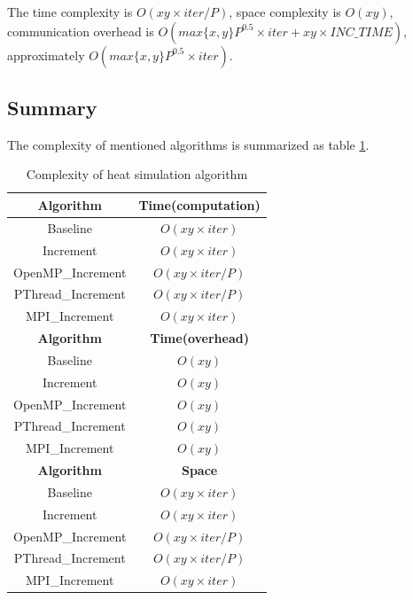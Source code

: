 \documentclass{acm_proc_article-sp}
\begin{document}
The time complexity is $O(xy\times iter/P)$, space complexity is $O(xy)$, communication overhead is $O(max\{x,y\}P^{0.5}\times iter+xy\times INC\_TIME)$, approximately $O(max\{x,y\}P^{0.5}\times iter)$.

\subsection{Summary}

The complexity of mentioned algorithms is summarized as table \ref{timecomplexity}.

\begin{table}[htbp]
  \centering\caption{\label{timecomplexity}Complexity of heat simulation algorithm}
  \begin{tabular}{cc}
  \toprule
		\textbf{Algorithm} & \textbf{Time(computation)} \\
  \midrule
		Baseline & $O(xy\times iter)$ \\
		Increment & $O(xy\times iter)$ \\
		OpenMP\_Increment & $O(xy\times iter/P)$ \\
		PThread\_Increment & $O(xy\times iter/P)$ \\
		MPI\_Increment & $O(xy\times iter)$ \\
   \midrule
   \textbf{Algorithm} & \textbf{Time(overhead)}\\
   \midrule
		Baseline & $O(xy)$ \\
		Increment & $O(xy)$ \\
		OpenMP\_Increment & $O(xy)$ \\
		PThread\_Increment & $O(xy)$ \\
		MPI\_Increment & $O(xy)$ \\
   \midrule
   \textbf{Algorithm} & \textbf{Space}\\
   \midrule
		Baseline & $O(xy\times iter)$ \\
		Increment & $O(xy\times iter)$ \\
		OpenMP\_Increment & $O(xy\times iter/P)$ \\
		PThread\_Increment & $O(xy\times iter/P)$ \\
		MPI\_Increment & $O(xy\times iter)$ \\ 
  \bottomrule
  \end{tabular}
\end{table}
\end{document}
